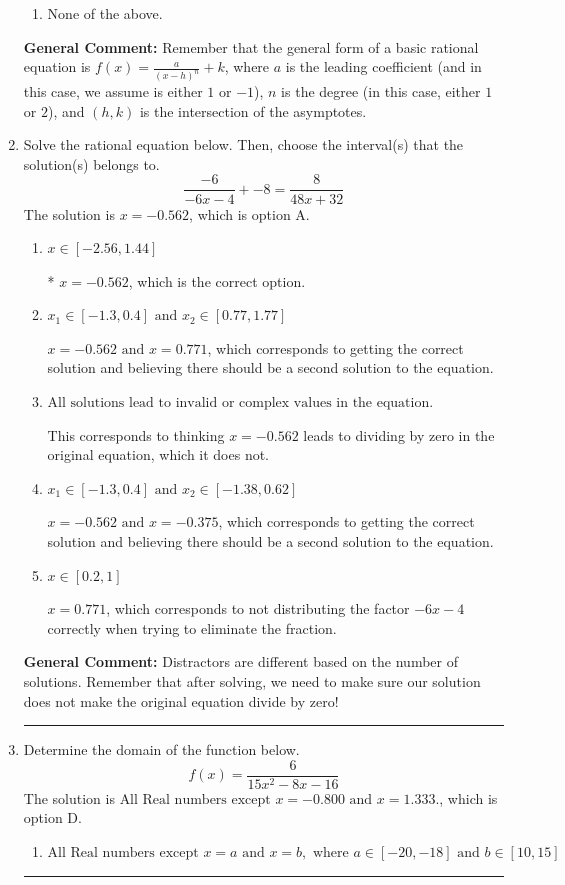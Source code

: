 \documentclass{extbook}[14pt]
\newcommand{\litem}[1]{\item #1

\rule{\textwidth}{0.4pt}}
\begin{document}
\begin{enumerate}
{\begin{enumerate}[label=\Alph*.]
\begin{multicols}{2}
\end{multicols}\item None of the above.\end{enumerate}
\textbf{General Comment:} Remember that the general form of a basic rational equation is $ f(x) = \frac{a}{(x-h)^n} + k$, where $a$ is the leading coefficient (and in this case, we assume is either $1$ or $-1$), $n$ is the degree (in this case, either $1$ or $2$), and $(h, k)$ is the intersection of the asymptotes.
}
\litem{
Solve the rational equation below. Then, choose the interval(s) that the solution(s) belongs to.
\[ \frac{-6}{-6x -4} + -8 = \frac{8}{48x + 32} \]The solution is \( x = -0.562 \), which is option A.\begin{enumerate}[label=\Alph*.]
\item \( x \in [-2.56,1.44] \)

* $x = -0.562$, which is the correct option.
\item \( x_1 \in [-1.3, 0.4] \text{ and } x_2 \in [0.77,1.77] \)

$x = -0.562 \text{ and } x = 0.771$, which corresponds to getting the correct solution and believing there should be a second solution to the equation.
\item \( \text{All solutions lead to invalid or complex values in the equation.} \)

This corresponds to thinking $x = -0.562$ leads to dividing by zero in the original equation, which it does not.
\item \( x_1 \in [-1.3, 0.4] \text{ and } x_2 \in [-1.38,0.62] \)

$x = -0.562 \text{ and } x = -0.375$, which corresponds to getting the correct solution and believing there should be a second solution to the equation.
\item \( x \in [0.2,1] \)

$x = 0.771$, which corresponds to not distributing the factor $-6x -4$ correctly when trying to eliminate the fraction.
\end{enumerate}

\textbf{General Comment:} Distractors are different based on the number of solutions. Remember that after solving, we need to make sure our solution does not make the original equation divide by zero!
}
\litem{
Determine the domain of the function below.
\[ f(x) = \frac{6}{15x^{2} -8 x -16} \]The solution is \( \text{All Real numbers except } x = -0.800 \text{ and } x = 1.333. \), which is option D.\begin{enumerate}[label=\Alph*.]
\item \( \text{All Real numbers except } x = a \text{ and } x = b, \text{ where } a \in [-20, -18] \text{ and } b \in [10, 15] \)


\end{enumerate}}
\end{enumerate}
\end{document}
